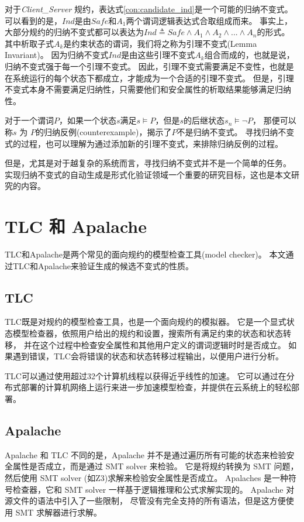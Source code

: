 对于\textit{Client\_Server} 规约，表达式\ref{con:candidate_ind}是一个可能的归纳不变式。
可以看到的是，$Ind$是由$Safe$和$A_{1}$两个谓词逻辑表达式合取组成而来。
事实上，大部分规约的归纳不变式都可以表达为$Ind \triangleq Safe \wedge A_1 \wedge A_2 \wedge... \wedge A_n$的形式。
其中析取子式$A_k$是约束状态的谓词，我们将之称为引理不变式(Lemma Invariant)。
因为归纳不变式$Ind$是由这些引理不变式$A_k$组合而成的，也就是说，归纳不变式强于每一个引理不变式。
因此，引理不变式需要满足不变性，也就是在系统运行的每个状态下都成立，才能成为一个合适的引理不变式。
但是，引理不变式本身不需要满足归纳性，只需要他们和安全属性的析取结果能够满足归纳性。

对于一个谓词$P$，如果一个状态$s$满足$s \models P$，但是$s$的后继状态$s_{n} \models \neg P$，
那便可以称$s$ 为 $P$的归纳反例(counterexample)，揭示了$P$不是归纳不变式。
寻找归纳不变式的过程，也可以理解为通过添加新的引理不变式，来排除归纳反例的过程。

但是，尤其是对于越复杂的系统而言，寻找归纳不变式并不是一个简单的任务。
实现归纳不变式的自动生成是形式化验证领域一个重要的研究目标，这也是本文研究的内容。

\section{TLC 和 Apalache}
TLC和Apalache是两个常见的面向\TLA 规约的模型检查工具(model checker)。
本文通过TLC和Apalache来验证生成的候选不变式的性质。

\subsection{TLC}
TLC既是对\TLA 规约的模型检查工具，也是一个面向规约的模拟器。
它是一个显式状态模型检查器，依照用户给出的规约和设置，搜索所有满足约束的状态和状态转移，
并在这个过程中检查安全属性和其他用户定义的谓词逻辑时时是否成立。
如果遇到错误，TLC会将错误的状态和状态转移过程输出，以便用户进行分析。

TLC可以通过使用超过32个计算机线程以获得近乎线性的加速。
它可以通过在分布式部署的计算机网络上运行来进一步加速模型检查，并提供在云系统上的轻松部署。

\subsection{Apalache}
Apalache\cite{apalache1, apalache2} 和 TLC 不同的是，Apalache 并不是通过遍历所有可能的状态来检验安全属性是否成立，而是通过 SMT solver 来检验。
它是将\TLA 规约转换为 SMT 问题，然后使用 SMT solver (如Z3\cite{z3})求解来检验安全属性是否成立。
Apalaches 是一种符号检查器，它和 SMT solver 一样基于逻辑推理和公式求解实现的。
Apalache 对\TLA 源文件的语法中引入了一些限制，
尽管没有完全支持\TLA 的所有语法，但是这方便使用 SMT 求解器进行求解。

